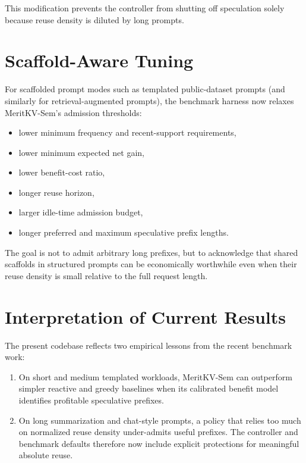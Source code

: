 \documentclass[11pt]{article}
\begin{document}
This modification prevents the controller from shutting off speculation solely
because reuse density is diluted by long prompts.

\section{Scaffold-Aware Tuning}

For scaffolded prompt modes such as templated public-dataset prompts (and similarly
for retrieval-augmented prompts), the benchmark harness now relaxes MeritKV-Sem's
admission thresholds:

\begin{itemize}
    \item lower minimum frequency and recent-support requirements,
    \item lower minimum expected net gain,
    \item lower benefit-cost ratio,
    \item longer reuse horizon,
    \item larger idle-time admission budget,
    \item longer preferred and maximum speculative prefix lengths.
\end{itemize}

The goal is not to admit arbitrary long prefixes, but to acknowledge that shared
scaffolds in structured prompts can be economically worthwhile even when their reuse
density is small relative to the full request length.

\section{Interpretation of Current Results}

The present codebase reflects two empirical lessons from the recent benchmark work:

\begin{enumerate}
    \item On short and medium templated workloads, MeritKV-Sem can outperform simpler
    reactive and greedy baselines when its calibrated benefit model identifies
    profitable speculative prefixes.

    \item On long summarization and chat-style prompts, a policy that relies too much
    on normalized reuse density under-admits useful prefixes. The controller and
    benchmark defaults therefore now include explicit protections for meaningful
    absolute reuse.
\end{enumerate}
\end{document}
